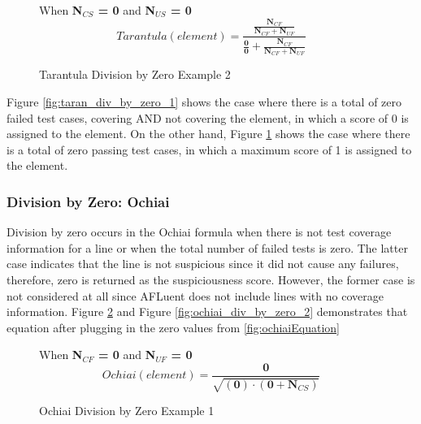 \begin{figure}[!htb]
	\begin{center}
        When \textbf{N$_{CS}$ = 0} and \textbf{N$_{US}$ = 0 }
		\begin{equation}
			Tarantula(element) = \frac{\frac{\textbf{N$_{CF}$}}{\textbf{N$_{CF}$} + \textbf{N$_{UF}$}}}{\frac{\textbf{0}}{\textbf{0}} + \frac{\textbf{N$_{CF}$}}{\textbf{N$_{CF}$}+\textbf{N$_{UF}$}}}
		\end{equation}
		\caption{\label{fig:taran_div_by_zero_2} Tarantula Division by Zero Example 2}
	\end{center}
\end{figure}

Figure \ref{fig:taran_div_by_zero_1} shows the case where there is a total of zero
failed test cases, covering AND not covering the element, in which a score
of 0 is assigned to the element. On the other hand,
Figure \ref{fig:taran_div_by_zero_2} shows the case where there is a total of zero
passing test cases, in which a maximum score of 1 is assigned to the element.

\subsubsection{Division by Zero: Ochiai}
\label{subsubsec:div_by_zero_ochiai}

Division by zero occurs in the Ochiai formula when there is not test coverage
information for a line or when the total number of failed tests is zero.
The latter case indicates that the line is not suspicious since it did not
cause any failures, therefore, zero is returned as the suspiciousness score.
However, the former case is not considered at all since AFLuent does not include
lines with no coverage information.
Figure \ref{fig:ochiai_div_by_zero_1} and Figure \ref{fig:ochiai_div_by_zero_2}
demonstrates that equation after plugging in
the zero values from \ref{fig:ochiaiEquation}

\begin{figure}[!htb]
	\begin{center}
        When \textbf{N$_{CF}$ = 0} and \textbf{N$_{UF}$ = 0 }
		\begin{equation}
			Ochiai(element) = \frac{\textbf{0}}{\sqrt{(\textbf{0}) \cdot (\textbf{0}  + \textbf{N$_{CS}$})}}
		\end{equation}
		\caption{\label{fig:ochiai_div_by_zero_1} Ochiai Division by Zero Example 1}
	\end{center}
\end{figure}

